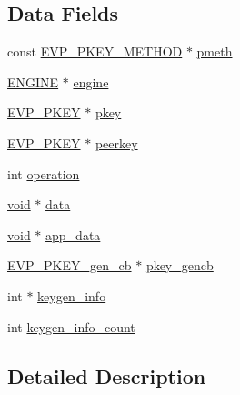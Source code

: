\subsection*{Data Fields}
\begin{DoxyCompactItemize}
\item 
const \hyperlink{crypto_2ossl__typ_8h_a7a0cee68de1a22bfd9f8c888256c1b5a}{E\+V\+P\+\_\+\+P\+K\+E\+Y\+\_\+\+M\+E\+T\+H\+OD} $\ast$ \hyperlink{structevp__pkey__ctx__st_a7e3facfcb3c425db04de11f7c3551069}{pmeth}
\item 
\hyperlink{crypto_2ossl__typ_8h_abac45b251498719318e60ab8d6192510}{E\+N\+G\+I\+NE} $\ast$ \hyperlink{structevp__pkey__ctx__st_a4eb35fa252ec72ad7c53a4c8d30a7fd3}{engine}
\item 
\hyperlink{crypto_2ossl__typ_8h_a2fca4fef9e4c7a2a739b1ea04acb56ce}{E\+V\+P\+\_\+\+P\+K\+EY} $\ast$ \hyperlink{structevp__pkey__ctx__st_a76a3c5d8ec8f468075eb3e366a35a83c}{pkey}
\item 
\hyperlink{crypto_2ossl__typ_8h_a2fca4fef9e4c7a2a739b1ea04acb56ce}{E\+V\+P\+\_\+\+P\+K\+EY} $\ast$ \hyperlink{structevp__pkey__ctx__st_a54113e3eb4b139e5992ebbd26874049b}{peerkey}
\item 
int \hyperlink{structevp__pkey__ctx__st_a379cf8e0eb9f9b239479fa5764b568af}{operation}
\item 
\hyperlink{hw__4758__cca_8h_afad4d591c7931ff6dc5bf69c76c96aa0}{void} $\ast$ \hyperlink{structevp__pkey__ctx__st_a735984d41155bc1032e09bece8f8d66d}{data}
\item 
\hyperlink{hw__4758__cca_8h_afad4d591c7931ff6dc5bf69c76c96aa0}{void} $\ast$ \hyperlink{structevp__pkey__ctx__st_a02f2e20ee9163913d729eb922b3c672a}{app\+\_\+data}
\item 
\hyperlink{include_2openssl_2evp_8h_ab6a59740427263dd6c5fe9e088e84e6f}{E\+V\+P\+\_\+\+P\+K\+E\+Y\+\_\+gen\+\_\+cb} $\ast$ \hyperlink{structevp__pkey__ctx__st_a1a7a67ebe3f6fc147e7b00c077cda412}{pkey\+\_\+gencb}
\item 
int $\ast$ \hyperlink{structevp__pkey__ctx__st_af985dc1be4859bbef3dbe99690d3d59e}{keygen\+\_\+info}
\item 
int \hyperlink{structevp__pkey__ctx__st_a687cd07265611acedb5adf7765039976}{keygen\+\_\+info\+\_\+count}
\end{DoxyCompactItemize}


\subsection{Detailed Description}


